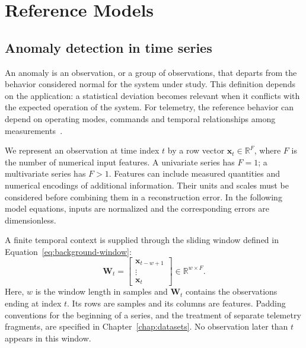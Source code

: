 \chapter{Reference Models}
\label{chap:background}


\section{Anomaly detection in time series}
\label{sec:background-anomalies}
An anomaly is an observation, or a group of observations, that departs from
the behavior considered normal for the system under study. This definition
depends on the application: a statistical deviation becomes relevant when it
conflicts with the expected operation of the system. For telemetry, the
reference behavior can depend on operating modes, commands and temporal
relationships among measurements~\cite{Chandola2009AnomalySurvey,Hundman2018Spacecraft}.

We represent an observation at time index \(t\) by a row vector
\(\mathbf{x}_t\in\mathbb{R}^{F}\), where \(F\) is the number of numerical input
features. A univariate series has \(F=1\); a multivariate series has \(F>1\).
Features can include measured quantities and numerical encodings of additional
information. Their units and scales must be considered before combining them
in a reconstruction error. In the following model equations, inputs are
normalized and the corresponding errors are dimensionless.

A finite temporal context is supplied through the sliding window defined in
Equation~\eqref{eq:background-window}:
\begin{equation}
  \mathbf{W}_t =
  \begin{bmatrix}
    \mathbf{x}_{t-w+1}\\
    \vdots\\
    \mathbf{x}_{t}
  \end{bmatrix}
  \in \mathbb{R}^{w\times F}.
  \label{eq:background-window}
\end{equation}
Here, \(w\) is the window length in samples and \(\mathbf{W}_t\) contains the
observations ending at index \(t\). Its rows are samples and its columns are
features. Padding conventions for the beginning of a series, and the treatment
of separate telemetry fragments, are specified in Chapter~\ref{chap:datasets}.
No observation later than \(t\) appears in this window.

